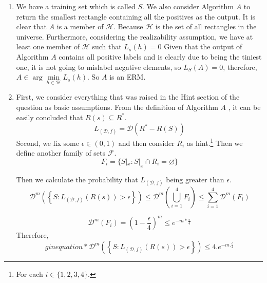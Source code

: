 \documentclass[]{book}
\theoremstyle{definition}
\begin{document}
\begin{enumerate}
    \item We have a training set which is called $S$. We also consider Algorithm $A$ to return the smallest rectangle containing all the positives as the output. It is clear that $A$ is a member of $\mathcal{H}$. Because $\mathcal{H}$ is the set of all rectangles in the universe. Furthermore, considering the  realizability assumption, we have at least one member of $\mathcal{H}$ such that $ L_s (h) = 0 $ Given that the output of Algorithm $A$ contains all positive labels and is clearly due to being the tiniest one, it is not going to mislabel negative elements, so $ L_S (A) = 0 $, therefore, $A \in \arg \underset{h \in \mathcal{H}}{\min} L_s(h)$. So $A$ is an ERM.
    \item 
       First, we consider everything that was raised in the Hint section of the question as basic assumptions. From the definition of Algorithm $A$ , it can be easily concluded that $ R(s) \subseteq R^* $.
    \begin{equation*}
        L_{(\mathcal{D},f)}=\mathcal{D}(R^*-R(S))
    \end{equation*}
    Second, we fix some $\epsilon \in (0,1)$ and then consider $R_i$ as hint.\footnote{For each $i\in \{1,2,3,4\}$.} Then we define another family of sets $\mathcal{F}$.
    \begin{equation*}
        F_i=\{S|_x:S|_x \cap R_i = \varnothing \}
    \end{equation*}
    
    Then we calculate the probability that $L_{(\mathcal{D},f)}$ being greater than $\epsilon$.
    \begin{equation*}
        \mathcal{D}^m \left ( \left \{  S:   L_{(\mathcal{D},f)}(R(s))>\epsilon \right \} \right ) \leq \mathcal{D}^m \left ( \bigcup_{i=1}^{4} F_i \right ) \leq \sum_{i=1}^{4} \mathcal{D}^m \left ( F_i \right )
    \end{equation*}
    

    \begin{equation*}
        \mathcal{D}^m(F_i)=(1-\frac{\epsilon}{4})^m \leq e^{-m*\frac{\epsilon}{4}}
    \end{equation*}
    Therefore,
    \begin{equation*}
        gin{equation*}
        \mathcal{D}^m \left ( \left \{  S:   L_{(\mathcal{D},f)}(R(s))>\epsilon \right \} \right ) \leq 4.e^{-m.\frac{\epsilon}{4}}
    \end{equation*}
    

\end{enumerate}
\end{document}
